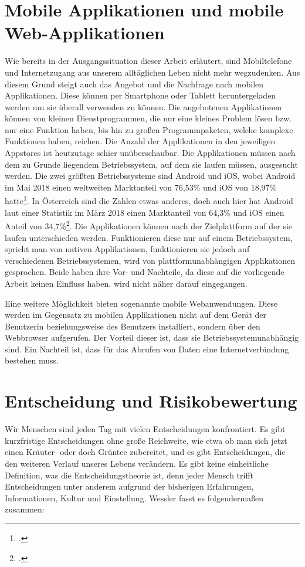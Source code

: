 \section{Mobile Applikationen und mobile Web-Applikationen}

Wie bereits in der Ausgangssituation dieser Arbeit erläutert, sind Mobiltelefone und Internetzugang aus unserem alltäglichen Leben nicht mehr wegzudenken. Aus diesem Grund steigt auch das Angebot und die Nachfrage nach mobilen Applikationen. Diese können per Smartphone oder Tablett heruntergeladen werden um sie überall verwenden zu können. Die angebotenen Applikationen können von kleinen Dienstprogrammen, die nur eine kleines Problem lösen bzw. nur eine Funktion haben, bis hin zu großen Programmpaketen, welche komplexe Funktionen haben, reichen. Die Anzahl der Applikationen in den jeweiligen Appstores ist heutzutage schier unüberschaubar. Die Applikationen müssen nach dem zu Grunde liegendem Betriebssystem, auf dem sie laufen müssen, ausgesucht werden. Die zwei größten Betriebssysteme sind Android und iOS, wobei Android im Mai 2018 einen weltweiten Marktanteil von 76,53\% und iOS von 18,97\% hatte\footcite{mobileos}. In Österreich sind die Zahlen etwas anderes, doch auch hier hat Android laut einer Statistik im März 2018 einen Marktanteil von 64,3\% und iOS einen Anteil von 34,7\%\footcite{stat}.
Die Applikationen können nach der Zielplattform auf der sie laufen unterschieden werden. Funktionieren diese nur auf einem Betriebssystem, spricht man von nativen Applikationen, funktionieren sie jedoch auf verschiedenen Betriebssystemen, wird von plattformunabhängigen Applikationen gesprochen. Beide haben ihre Vor- und Nachteile, da diese auf die vorliegende Arbeit keinen Einfluss haben, wird nicht näher darauf eingegangen.

Eine weitere Möglichkeit bieten sogenannte mobile Webanwendungen. Diese werden im Gegensatz zu mobilen Applikationen nicht auf dem Gerät der Benutzerin beziehungsweise des Benutzers installiert, sondern über den Webbrowser aufgerufen. Der Vorteil dieser ist, dass sie Betriebssystemunabhängig sind. Ein Nachteil ist, dass für das Abrufen von Daten eine Internetverbindung bestehen muss.

\section{Entscheidung und Risikobewertung}

Wir Menschen sind jeden Tag mit vielen Entscheidungen konfrontiert. Es gibt kurzfristige Entscheidungen ohne große Reichweite, wie etwa ob man sich jetzt einen Kräuter- oder doch Grüntee zubereitet, und es gibt Entscheidungen, die den weiteren Verlauf unseres Lebens verändern. Es gibt keine einheitliche Definition, was die Entscheidungstheorie ist, denn jeder Mensch trifft Entscheidungen unter anderem aufgrund der bisherigen Erfahrungen, Informationen, Kultur und Einstellung. Wessler fasst es folgendermaßen zusammen:

